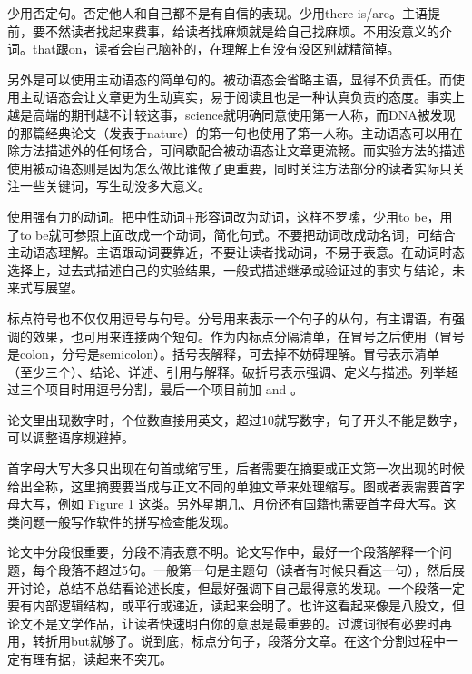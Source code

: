 \documentclass[]{tufte-book}
\begin{document}
少用否定句。否定他人和自己都不是有自信的表现。少用there is/are。主语提前，要不然读者找起来费事，给读者找麻烦就是给自己找麻烦。不用没意义的介词。that跟on，读者会自己脑补的，在理解上有没有没区别就精简掉。

另外是可以使用主动语态的简单句的。被动语态会省略主语，显得不负责任。而使用主动语态会让文章更为生动真实，易于阅读且也是一种认真负责的态度。事实上越是高端的期刊越不计较这事，science就明确同意使用第一人称，而DNA被发现的那篇经典论文（发表于nature）的第一句也使用了第一人称。主动语态可以用在除方法描述外的任何场合，可间歇配合被动语态让文章更流畅。而实验方法的描述使用被动语态则是因为怎么做比谁做了更重要，同时关注方法部分的读者实际只关注一些关键词，写生动没多大意义。

使用强有力的动词。把中性动词+形容词改为动词，这样不罗嗦，少用to be，用了to be就可参照上面改成一个动词，简化句式。不要把动词改成动名词，可结合主动语态理解。主语跟动词要靠近，不要让读者找动词，不易于表意。在动词时态选择上，过去式描述自己的实验结果，一般式描述继承或验证过的事实与结论，未来式写展望。

标点符号也不仅仅用逗号与句号。分号用来表示一个句子的从句，有主谓语，有强调的效果，也可用来连接两个短句。作为内标点分隔清单，在冒号之后使用（冒号是colon，分号是semicolon）。括号表解释，可去掉不妨碍理解。冒号表示清单（至少三个）、结论、详述、引用与解释。破折号表示强调、定义与描述。列举超过三个项目时用逗号分割，最后一个项目前加 and 。

论文里出现数字时，个位数直接用英文，超过10就写数字，句子开头不能是数字，可以调整语序规避掉。

首字母大写大多只出现在句首或缩写里，后者需要在摘要或正文第一次出现的时候给出全称，这里摘要要当成与正文不同的单独文章来处理缩写。图或者表需要首字母大写，例如 Figure 1 这类。另外星期几、月份还有国籍也需要首字母大写。这类问题一般写作软件的拼写检查能发现。

论文中分段很重要，分段不清表意不明。论文写作中，最好一个段落解释一个问题，每个段落不超过5句。一般第一句是主题句（读者有时候只看这一句），然后展开讨论，总结不总结看论述长度，但最好强调下自己最得意的发现。一个段落一定要有内部逻辑结构，或平行或递近，读起来会明了。也许这看起来像是八股文，但论文不是文学作品，让读者快速明白你的意思是最重要的。过渡词很有必要时再用，转折用but就够了。说到底，标点分句子，段落分文章。在这个分割过程中一定有理有据，读起来不突兀。
\end{document}
